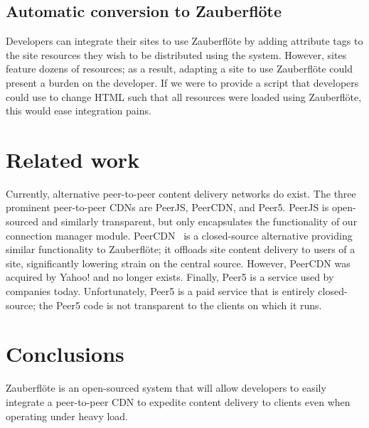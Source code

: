 \documentclass[letterpaper,twocolumn,10pt]{article}
\newcommand{\zbf}{Zauberfl\"{o}te\xspace}
\begin{document}
\subsection{Automatic conversion to \zbf}
Developers can integrate their sites to use \zbf by adding attribute tags to
the site resources they wish to be distributed using the system. However, sites feature
dozens of resources; as a result, adapting a site to use \zbf could present a
burden on the developer. If we were to provide a script that developers could use
to change HTML such that all resources were loaded using \zbf, this would ease
integration pains.

\section{Related work}

Currently, alternative peer-to-peer content delivery networks do exist. The three
prominent peer-to-peer CDNs are PeerJS, PeerCDN, and Peer5. PeerJS is open-sourced
and similarly transparent, but only encapsulates the functionality of our connection manager
module. PeerCDN~\cite{peercdn} is a closed-source alternative providing  similar
functionality to \zbf; it offloads site content delivery to users of a site,
significantly lowering strain on the central source. However, PeerCDN was acquired by
Yahoo! and no longer exists. Finally, Peer5 is a service used by companies today.
Unfortunately, Peer5 is a paid service that is entirely closed-source; the Peer5 code is
not transparent to the clients on which it runs.

\section{Conclusions}

\zbf is an open-sourced system
that will allow developers to easily integrate a peer-to-peer CDN to expedite
content delivery to clients even when operating under heavy load.



{\footnotesize 
}
\end{document}
